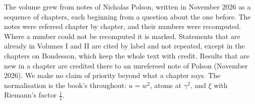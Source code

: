 The volume grew from notes of Nicholas Polson, written in November 2026 as a sequence of chapters, each beginning from a question about the one before. The notes were refereed chapter by chapter, and their numbers were recomputed. Where a number could not be recomputed it is marked. Statements that are already in Volumes I and II are cited by label and not repeated, except in the chapters on Bondesson, which keep the whole text with credit. Results that are new in a chapter are credited there to an unrefereed note of Polson (November 2026). We make no claim of priority beyond what a chapter says. The normalisation is the book's throughout: $u=w^2$, atoms at $\gamma^2$, and $\xi$ with Riemann's factor $\frac12$.

